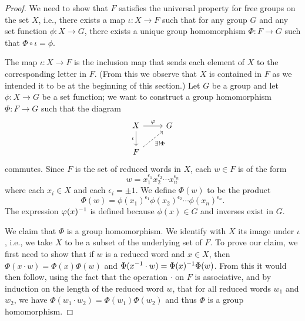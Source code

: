 \begin{proof}
    We need to show that \(F\) satisfies the universal property for free groups
    on the set \(X\), i.e., there exists a map \(\iota: X \to F\) such that for
    any group \(G\) and any set function \(\phi: X \to G\), there exists a
    unique group homomorphism \(\Phi: F \to G\) such that \(\Phi \circ \iota =
    \phi\).

    The map \(\iota: X \to F\) is the inclusion map that sends each element of
    \(X\) to the corresponding letter in \(F\). (From this we observe that \(X\)
    is contained in \(F\) as we intended it to be at the beginning of this
    section.) Let \(G\) be a group and let \(\phi: X \to G\) be a set function;
    we want to construct a group homomorphism \(\Phi: F \to G\) such that the
    diagram
    \[
        \begin{tikzcd}
            X \arrow[d, "\iota"'] \arrow[r, "\phi"] & G \\
            F \arrow[ru, "\exists!\Phi"', dashed]        &  
        \end{tikzcd}
    \]
    commutes. Since \(F\) is the set of reduced words in \(X\), each \(w \in F\)
    is of the form
    \[
        w = x_1^{\epsilon_1} x_2^{\epsilon_2} \cdots x_n^{\epsilon_n}
    \]
    where each \(x_i \in X\) and each \(\epsilon_i = \pm 1\). We define
    \(\Phi(w)\) to be the product
    \[
        \Phi(w) = \phi(x_1)^{\epsilon_1} \phi(x_2)^{\epsilon_2} \cdots \phi(x_n)^{\epsilon_n}.
    \]
    The expression \(\varphi(x)^{-1}\) is defined because \(\phi(x) \in G\) and
    inverses exist in \(G\).
    
    We claim that \(\Phi\) is a group homomorphism. We identify with \(X\) its
    image under \(\iota\), i.e., we take \(X\) to be a subset of the underlying
    set of \(F\). To prove our claim, we first need to show that if \(w\) is a
    reduced word and \(x \in X\), then \(\Phi(x\cdot w) = \Phi(x)\Phi(w)\) and
    \(\Phi(x^{-1} \cdot w) = \Phi(x)^{-1}\Phi(w)\). From this it would then
    follow, using the fact that the operation \(\cdot\) on \(F\) is associative,
    and by induction on the length of the reduced word \(w\), that for all
    reduced words \(w_1\) and \(w_2\), we have \(\Phi(w_1 \cdot w_2) = \Phi(w_1)
    \Phi(w_2)\) and thus \(\Phi\) is a group homomorphism.


\end{proof}
